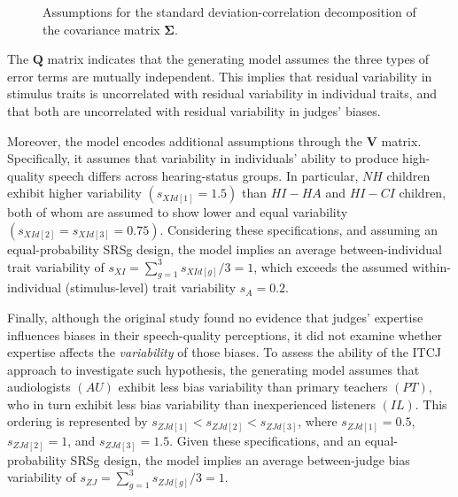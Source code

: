 \documentclass[
  authoryear,
  review,
  1p]{elsarticle}
\begin{document}
\begin{figure}

\centering{

\[
\begin{split}
\boldsymbol{Q} = \begin{bmatrix}
    1 & 0 & 0 \\
    0 & 1 & 0 \\
    0 & 0 & 1
\end{bmatrix} ;
\boldsymbol{V} = \begin{bmatrix}
    s_{XI} & 0 & 0 \\
    0 & s_{A} & 0 \\
    0 & 0 & s_{ZJ}
\end{bmatrix}
\end{split}
\]

}

\caption{\label{fig-CP_covariance}Assumptions for the standard
deviation-correlation decomposition of the covariance matrix
\(\boldsymbol{\Sigma}\).}

\end{figure}%

The \(\boldsymbol{Q}\) matrix indicates that the generating model
assumes the three types of error terms are mutually independent. This
implies that residual variability in stimulus traits is uncorrelated
with residual variability in individual traits, and that both are
uncorrelated with residual variability in judges' biases.

Moreover, the model encodes additional assumptions through the
\(\boldsymbol{V}\) matrix. Specifically, it assumes that variability in
individuals' ability to produce high-quality speech differs across
hearing-status groups. In particular, \(NH\) children exhibit higher
variability \((s_{XId[1]} = 1.5)\) than \(HI-HA\) and \(HI-CI\)
children, both of whom are assumed to show lower and equal variability
\((s_{XId[2]} = s_{XId[3]} = 0.75)\). Considering these specifications,
and assuming an equal-probability SRSg design, the model implies an
average between-individual trait variability of
\(s_{XI} = \sum_{g=1}^{3} s_{XId[g]}/3 = 1\), which exceeds the assumed
within-individual (stimulus-level) trait variability \(s_{A} = 0.2\).

Finally, although the original study found no evidence that judges'
expertise influences biases in their speech-quality perceptions, it did
not examine whether expertise affects the \emph{variability} of those
biases. To assess the ability of the ITCJ approach to investigate such
hypothesis, the generating model assumes that audiologists \((AU)\)
exhibit less bias variability than primary teachers \((PT)\), who in
turn exhibit less bias variability than inexperienced listeners
\((IL)\). This ordering is represented by
\(s_{ZJd[1]} < s_{ZJd[2]} < s_{ZJd[3]}\), where \(s_{ZJd[1]} = 0.5\),
\(s_{ZJd[2]} = 1\), and \(s_{ZJd[3]} = 1.5\). Given these
specifications, and an equal-probability SRSg design, the model implies
an average between-judge bias variability of
\(s_{ZJ} = \sum_{g=1}^{3} s_{ZJd[g]}/3 = 1\).
\end{document}
